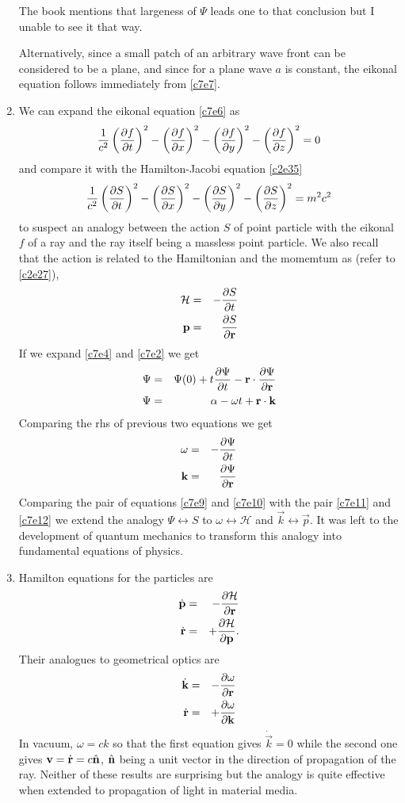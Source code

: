 \begin{enumerate}
The book mentions that largeness of $\Psi$ leads one to that conclusion but I 
unable to see it that way.

Alternatively, since a small patch of an arbitrary wave front can be considered
to be a plane, and since for a plane wave $a$ is constant, the eikonal equation
follows immediately from \eqref{c7e7}.

\item We can expand the eikonal equation \eqref{c7e6} as
\[
\frac{1}{c^2}\left(\frac{\partial{f}}{\partial{t}}\right)^2 - \left(\frac{\partial{f}}{\partial{x}}\right)^2 - 
\left(\frac{\partial{f}}{\partial{y}}\right)^2 - \left(\frac{\partial{f}}{\partial{z}}\right)^2 = 0
\]
and compare it with the Hamilton-Jacobi equation \eqref{c2e35}
\[
\frac{1}{c^2}\left(\frac{\partial{S}}{\partial{t}}\right)^2 - \left(\frac{\partial{S}}{\partial{x}}\right)^2 
- \left(\frac{\partial{S}}{\partial{y}}\right)^2 - \left(\frac{\partial{S}}{\partial{z}}\right)^2 = m^2c^2
\]
to suspect an analogy between the action $S$ of point particle with the eikonal
$f$ of a ray and the ray itself being a massless point particle. We also recall
that the action is related to the Hamiltonian and the momemtum as (refer to
\eqref{c2e27}),
\begin{eqnarray}
\mathcal{H} &=& -\frac{\partial{S}}{\partial{t}} \label{c7e9} \\
\mathbf{p} &=& \frac{\partial{S}}{\partial{\mathbf{r}}} \label{c7e10}
\end{eqnarray}
If we expand \eqref{c7e4} and \eqref{c7e2} we get
\begin{eqnarray*}
\Psi &=& \Psi(0) + t\frac{\partial{\Psi}}{\partial{t}} - \mathbf{r}\cdot\frac{\partial{\Psi}}{\partial{\mathbf{r}}} \\
\Psi &=& \alpha - \omega t + \mathbf{r}\cdot\mathbf{k}
\end{eqnarray*}
Comparing the rhs of previous two equations we get
\begin{eqnarray}
\omega &=& -\frac{\partial{\Psi}}{\partial{t}} \label{c7e11} \\
\mathbf{k} &=& \frac{\partial{\Psi}}{\partial{\mathbf{r}}} \label{c7e12}
\end{eqnarray}
Comparing the pair of equations \eqref{c7e9} and \eqref{c7e10} with the pair
\eqref{c7e11} and \eqref{c7e12} we extend the analogy $\Psi \leftrightarrow S$
to $\omega \leftrightarrow \mathcal{H}$ and $\vec{k} \leftrightarrow \vec{p}$.
It was left to the development of quantum mechanics to transform this analogy
into fundamental equations of physics.

\item Hamilton equations for the particles are
\begin{eqnarray*}
\dot{\mathbf{p}} &=& -\frac{\partial{\mathcal{H}}}{\partial{\mathbf{r}}} \\
\dot{\mathbf{r}} &=& +\frac{\partial{\mathcal{H}}}{\partial{\mathbf{p}}}.
\end{eqnarray*}
Their analogues to geometrical optics are
\begin{eqnarray}
\dot{\mathbf{k}} &=& -\frac{\partial{\omega}}{\partial{\mathbf{r}}} \label{c7e13} \\
\dot{\mathbf{r}} &=& +\frac{\partial{\omega}}{\partial{\mathbf{k}}} \label{c7e14}
\end{eqnarray}
In vacuum, $\omega = ck$ so that the first equation gives $\dot{\vec{k}} = 0$ 
while the second one gives $\mathbf{v} = \dot{\mathbf{r}} = c\hat{\mathbf{n}}$, $\hat{\mathbf{n}}$ being a unit
vector in the direction of propagation of the ray. Neither of these results are 
surprising but the analogy is quite effective when extended to propagation of light
in material media.


\end{enumerate}
